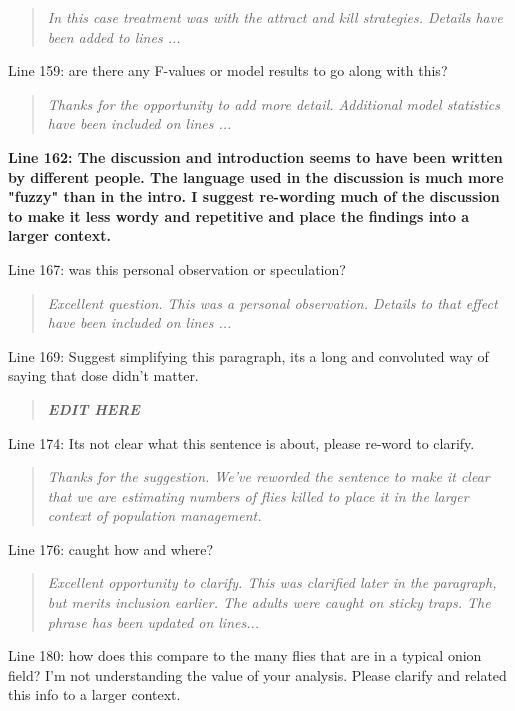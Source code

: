 \documentclass{article}
\begin{document}
\begin{quote}
    \textit{In this case treatment was with the attract and kill strategies.  Details have been added to lines ...}
\end{quote}

Line 159: are there any F-values or model results to go along with this?

\begin{quote}
    \textit{Thanks for the opportunity to add more detail.  Additional model statistics have been included on lines ...}
\end{quote}

\textbf{
Line 162: The discussion and introduction seems to have been written by different people. The language used in the discussion is much more "fuzzy" than in the intro. I suggest re-wording much of the discussion to make it less wordy and repetitive and place the findings into a larger context.
}

Line 167: was this personal observation or speculation?

\begin{quote}
    \textit{Excellent question.  This was a personal observation. Details to that effect have been included on lines ...}
\end{quote}

Line 169: Suggest simplifying this paragraph, its a long and convoluted way of saying that dose didn't matter.

\begin{quote}
    \textit{\textbf{EDIT HERE}}
\end{quote}

Line 174: Its not clear what this sentence is about, please re-word to clarify.

\begin{quote}
    \textit{Thanks for the suggestion.  We've reworded the sentence to make it clear that we are estimating numbers of flies killed to place it in the larger context of population management.  }
\end{quote}

Line 176: caught how and where?

\begin{quote}
    \textit{Excellent opportunity to clarify.  This was clarified later in the paragraph, but merits inclusion earlier.  The adults were caught on sticky traps.  The phrase has been updated on lines...}
\end{quote}

Line 180: how does this compare to the many flies that are in a typical onion field? I'm not understanding the value of your analysis. Please clarify and related this info to a larger context.
\end{document}
